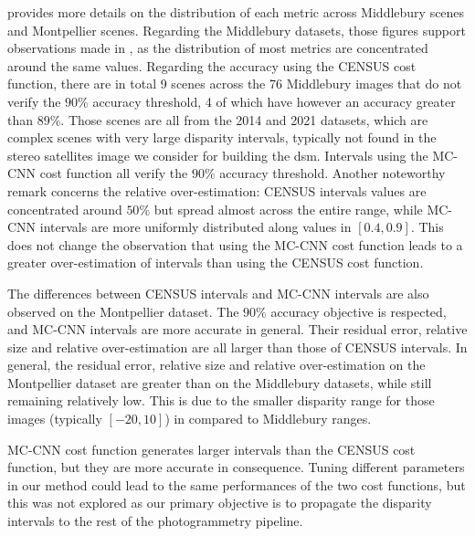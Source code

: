  provides more details on the distribution of each metric across Middlebury scenes and Montpellier scenes. Regarding the Middlebury datasets, those figures support observations made in , as the distribution of most metrics are concentrated around the same values. Regarding the accuracy using the CENSUS cost function, there are in total 9 scenes across the 76 Middlebury images that do not verify the $90\%$ accuracy threshold, 4 of which have however an accuracy greater than $89\%$. Those scenes are all from the 2014 and 2021 datasets, which are complex scenes with very large disparity intervals, typically not found in the stereo satellites image we consider for building the \acrshort{dsm}. Intervals using the MC-CNN cost function all verify the $90\%$ accuracy threshold. Another noteworthy remark concerns the relative over-estimation: CENSUS intervals values are concentrated around $50\%$ but spread almost across the entire range, while MC-CNN intervals are more uniformly distributed along values in $[0.4, 0.9]$. This does not change the observation that using the MC-CNN cost function leads to a greater over-estimation of intervals than using the CENSUS cost function. 

The differences between CENSUS intervals and MC-CNN intervals are also observed on the Montpellier dataset. The $90\%$ accuracy objective is respected, and MC-CNN intervals are more accurate in general. Their residual error, relative size and relative over-estimation are all larger than those of CENSUS intervals. In general, the residual error, relative size and relative over-estimation on the Montpellier dataset are greater than on the Middlebury datasets, while still remaining relatively low. This is due to the smaller disparity range for those images (typically $[-20, 10]$) in compared to Middlebury ranges. 

\begin{remark}
    MC-CNN cost function generates larger intervals than the CENSUS cost function, but they are more accurate in consequence. Tuning different parameters in our method could lead to the same performances of the two cost functions, but this was not explored as our primary objective is to propagate the disparity intervals to the rest of the photogrammetry pipeline.
\end{remark}


